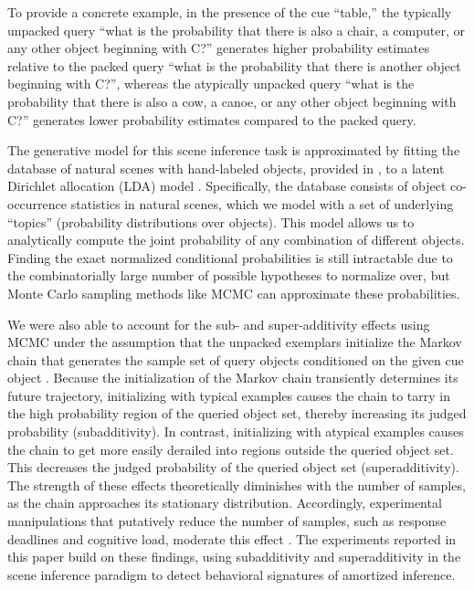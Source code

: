 To provide a concrete example, in the presence of the cue ``table,'' the typically unpacked query ``what is the probability that there is also a chair, a computer, or any other object beginning with C?'' generates higher probability estimates relative to the packed query ``what is the probability that there is another object beginning with C?'', whereas the atypically unpacked query ``what is the probability that there is also a cow, a canoe, or any other object beginning with C?'' generates lower probability estimates compared to the packed query.


The generative model for this scene inference task is approximated by fitting the database of natural scenes with hand-labeled objects, provided in \citet{greene13}, to a latent Dirichlet allocation (LDA) model \citep{blei2003latent}. Specifically, the database consists of object co-occurrence statistics in natural scenes, which we model with a set of underlying ``topics'' (probability distributions over objects). This model allows us to analytically compute the joint probability of any combination of different objects. Finding the exact normalized conditional probabilities is still intractable due to the combinatorially large number of possible hypotheses to normalize over, but Monte Carlo sampling methods like MCMC can approximate these probabilities.



We were also able to account for the sub- and super-additivity effects using MCMC under the assumption that the unpacked exemplars initialize the Markov chain that generates the sample set of query objects conditioned on the given cue object \citep{dasgupta2017hypotheses}. 
Because the initialization of the Markov chain transiently determines its future trajectory, initializing with typical examples causes the chain to tarry in the high probability region of the queried object set, thereby increasing its judged probability (subadditivity). In contrast, initializing with atypical examples causes the chain to get more easily derailed into regions outside the queried object set. This decreases the judged probability of the queried object set (superadditivity). The strength of these effects theoretically diminishes with the number of samples, as the chain approaches its stationary distribution. Accordingly, experimental manipulations that putatively reduce the number of samples, such as response deadlines and cognitive load, moderate this effect \citep{dasgupta2017hypotheses}. The experiments reported in this paper build on these findings, using subadditivity and superadditivity in the scene inference paradigm to detect behavioral signatures of amortized inference.


